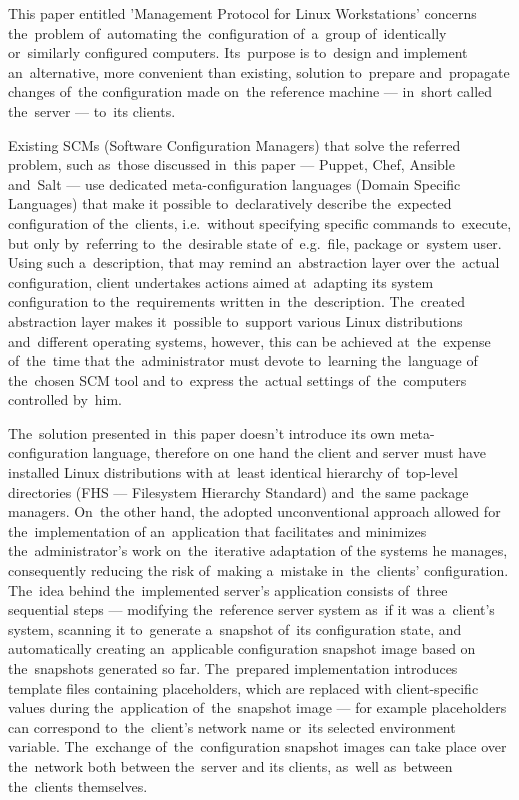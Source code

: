\documentclass[11pt,a4paper]{article}
\begin{document}
This paper entitled 'Management Protocol for Linux Workstations' concerns the~problem of~automating the~configuration of~a~group of~identically or~similarly configured computers. Its~purpose is to~design and implement an~alternative, more convenient than existing, solution to~prepare and~propagate changes of~the configuration made on~the reference machine --- in~short called the~server --- to~its clients.

Existing SCMs (Software Configuration Managers) that solve the referred problem, such as~those discussed in~this paper --- Puppet, Chef, Ansible and~Salt --- use dedicated meta-configuration languages (Domain Specific Languages) that make it possible to~declaratively describe the~expected configuration of the~clients, i.e.~without specifying specific commands to~execute, but only by~referring to~the~desirable state of~e.g.~file, package or~system user. Using such a~description, that may remind an~abstraction layer over the~actual configuration, client undertakes actions aimed at~adapting its system configuration to the~requirements written in~the~description. The~created abstraction layer makes it~possible to~support various Linux distributions and~different operating systems, however, this can be achieved at~the~expense of~the~time that the~administrator must devote to~learning the~language of the~chosen SCM tool and to~express the~actual settings of~the~computers controlled by~him.

The~solution presented in~this paper doesn't introduce its own meta-configuration language, therefore on one hand the client and server must have installed Linux distributions with at~least identical hierarchy of~top-level directories (FHS --- Filesystem Hierarchy Standard) and~the same package managers. On~the other hand, the adopted unconventional approach allowed for the~implementation of an~application that facilitates and minimizes the~administrator's work on~the~iterative adaptation of the systems he manages, consequently reducing the risk of~making a~mistake in~the~clients' configuration. The~idea behind the~implemented server's application consists of~three sequential steps --- modifying the~reference server system as~if it was a~client's system, scanning it to~generate a~snapshot of~its configuration state, and automatically creating an~applicable configuration snapshot image based on the~snapshots generated so far. The~prepared implementation introduces template files containing placeholders, which are replaced with client-specific values during the~application of~the~snapshot image --- for example placeholders can correspond to~the~client's network name or~its selected environment variable. The~exchange of~the~configuration snapshot images can take place over the~network both between the~server and its clients, as~well as~between the~clients themselves.
\end{document}
